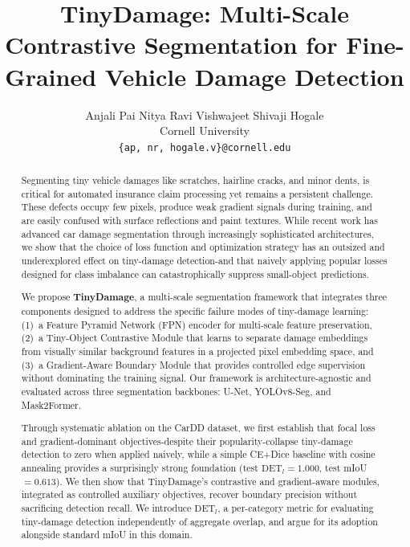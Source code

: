 \documentclass[10pt,twocolumn]{article}
\title{\textbf{TinyDamage: Multi-Scale Contrastive Segmentation for Fine-Grained Vehicle Damage Detection}}
\author{
  Anjali Pai \quad Nitya Ravi \quad Vishwajeet Shivaji Hogale \\
  Cornell University \\
  \texttt{\{ap, nr, hogale.v\}@cornell.edu}
}
\date{}
\begin{document}
\maketitle

\begin{abstract}
Segmenting tiny vehicle damages like scratches, hairline cracks, and minor dents, is critical for automated insurance claim processing yet remains a persistent challenge. These defects occupy few pixels, produce weak gradient signals during training, and are easily confused with surface reflections and paint textures. While recent work has advanced car damage segmentation through increasingly sophisticated architectures, we show that the choice of loss function and optimization strategy has an outsized and underexplored effect on tiny-damage detection-and that naively applying popular losses designed for class imbalance can catastrophically suppress small-object predictions.

We propose \textbf{TinyDamage}, a multi-scale segmentation framework that integrates three components designed to address the specific failure modes of tiny-damage learning: (1)~a Feature Pyramid Network (FPN) encoder for multi-scale feature preservation, (2)~a Tiny-Object Contrastive Module that learns to separate damage embeddings from visually similar background features in a projected pixel embedding space, and (3)~a Gradient-Aware Boundary Module that provides controlled edge supervision without dominating the training signal. Our framework is architecture-agnostic and evaluated across three segmentation backbones: U-Net, YOLOv8-Seg, and Mask2Former.

Through systematic ablation on the CarDD dataset, we first establish that focal loss and gradient-dominant objectives-despite their popularity-collapse tiny-damage detection to zero when applied naively, while a simple CE+Dice baseline with cosine annealing provides a surprisingly strong foundation (test $\text{DET}_l = 1.000$, test mIoU $= 0.613$). We then show that TinyDamage's contrastive and gradient-aware modules, integrated as controlled auxiliary objectives, recover boundary precision without sacrificing detection recall. We introduce $\text{DET}_l$, a per-category metric for evaluating tiny-damage detection independently of aggregate overlap, and argue for its adoption alongside standard mIoU in this domain.
\end{abstract}

\end{document}
